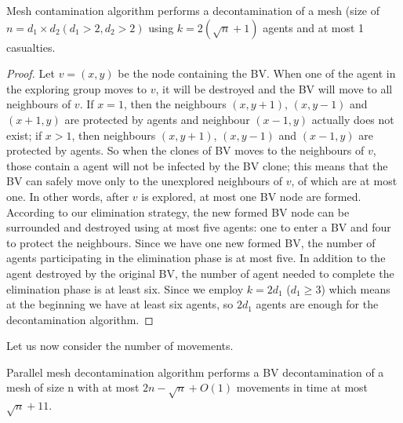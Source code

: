 \begin{theorem}
Mesh contamination algorithm performs a decontamination of a mesh (size of $n=d_1\times d_2(d_1>2,d_2>2)$ using $k=2(\sqrt{n}+1)$ agents and at most 1 casualties.
\end{theorem}
\begin{proof}
Let $v=(x, y)$ be the node containing the BV. When one of the agent in the exploring group moves to $v$, it will be destroyed and the BV will move to all neighbours of $v$. If $x=1$, then the neighbours $(x, y+1)$, $(x, y-1)$ and $(x+1, y)$ are protected by agents and neighbour $(x-1, y)$ actually does not exist; if $x>1$, then neighbours $(x, y+1)$, $(x, y-1)$ and $(x-1, y)$ are protected by agents. So when the clones of BV moves to the neighbours of $v$, those contain a agent will not be infected by the BV clone; this means that the BV can safely move only to the unexplored neighbours of $v$, of which are at most one. In other words, after $v$ is explored, at most one BV node are formed. According to our elimination strategy, the new formed BV node can be surrounded and destroyed using at most five agents: one to enter a BV and four to protect the neighbours. Since we have one new formed BV, the number of agents participating in the elimination phase is at most five. In addition to the agent destroyed by the original BV, the number of agent needed to complete the elimination phase is at least six. Since we employ $k=2d_1$ ($d_1\geq 3$) which means at the beginning we have at least six agents, so $2d_1$ agents are enough for the decontamination algorithm.
\end{proof}
Let us now consider the number of movements.
\begin{theorem}
Parallel mesh decontamination algorithm performs a BV decontamination of a mesh of size n with at most $2n-\sqrt{n}+O(1)$ movements in time at most $\sqrt{n}+11$.
\end{theorem}
